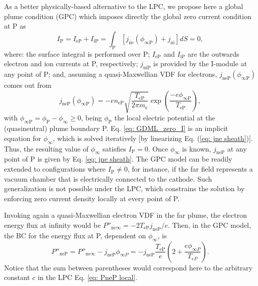 \documentclass[%
 aip,
cha,
 amsmath,amssymb,
 reprint,%
]{revtex4-1}
\begin{document}
As a better physically-based alternative to the LPC, we propose here a global plume condition (GPC) which imposes directly the global zero current condition at P as
%
\begin{equation}
    I_\mathrm{P} = I_\mathrm{eP} + I_\mathrm{iP} = \int_\mathrm{P} [j_\mathrm{ne}(\phi_\mathrm{\infty P}) + j_\mathrm{ni}] dS = 0,
    \label{eq: GDML_zero_I}
\end{equation}
%
where: the surface integral is performed over P; $I_\mathrm{eP}$ and $I_\mathrm{iP}$ are the outwards electron and ion currents at P, respectively; $j_\mathrm{niP}$ is provided by the I-module at any point of P; and, assuming a quasi-Maxwellian VDF for electrons, $j_\mathrm{neP}(\phi_\mathrm{\infty P})$ comes out from 
%
\begin{equation}
j_\mathrm{neP}(\phi_\mathrm{\infty P}) = - en_\mathrm{eP}\sqrt{\frac{T_\mathrm{eP}}{2\pi m_\mathrm{e}}}
\exp \left(\frac{-e\phi_\mathrm{\infty P}}{T_\mathrm{eP}}\right), 
\label{eq: jne sheath}
\end{equation}
%
with $\phi_\mathrm{\infty P}=\phi_\mathrm{P}-\phi_\infty \geq 0$,
being $\phi_\mathrm{P}$ the local electric potential at the (quasineutral) plume boundary P.
%
Eq. \eqref{eq: GDML_zero_I} is an implicit equation for $\phi_\infty$, which is solved iteratively [by linearizing Eq. (\ref{eq: jne sheath})]. Thus, the resulting value of $\phi_\infty$ satisfies $I_\mathrm{P} = 0$. Once $\phi_\infty$ is known, $j_\mathrm{neP}$ at any point of P is given by Eq. \eqref{eq: jne sheath}. 
%
The GPC model can be readily extended to configurations where $I_\mathrm{P} \neq 0$, for instance, if the far field represents a vacuum chamber that is electrically connected to the cathode. Such generalization is not possible under the LPC, which constrains the solution by enforcing zero current density locally at every point of P.


Invoking again a quasi-Maxwellian electron VDF in the far plume, the electron energy flux at infinity would be $P''_\mathrm{ne\infty} = -2T_\mathrm{eP}j_\mathrm{neP}/e$.
Then, in the GPC model, the BC for the energy flux at P, dependent on $\phi_\infty$, is 
\begin{equation}
    P''_\mathrm{neP} = P''_\mathrm{ne\infty} -j_\mathrm{neP}\phi_{\infty P}=
    -j_\mathrm{neP}\frac{T_\mathrm{eP}}{e}\left(2+\dfrac{e\phi_{\infty P}}{T_{eP}}\right).
    \label{eq: energy_flux_P}
\end{equation}
Notice that the sum between parentheses would correspond here to the arbitrary constant $c$ in the LPC Eq. \eqref{eq: PneP local}.
\end{document}
